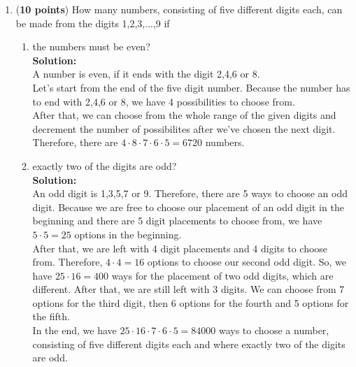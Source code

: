 \documentclass[a4paper]{article}
\begin{document}
\begin{enumerate}
\begin{enumerate}
	
\end{enumerate}




\item (\textbf{10 points}) How many numbers, consisting of five different digits each, can be made from the digits 1,2,3,...,9 if


\begin{enumerate}
	\item the numbers must be even?\\
	\textbf{Solution:}\\




A number is even, if it ends with the digit 2,4,6 or 8.\\
Let's start from the end of the five digit number. Because the number has to end with 2,4,6 or 8, we have 4 possibilities to choose from.\\

After that, we can choose from the whole range of the given digits and decrement the number of possibilites after we've chosen the next digit.\\

Therefore, there are $4 \cdot 8 \cdot 7 \cdot 6 \cdot 5 = 6720$ numbers.\\

	
	\item exactly two of the digits are odd?\\
	\textbf{Solution:}\\
	
An odd digit is 1,3,5,7 or 9. Therefore, there are 5 ways to choose an odd digit. Because we are free to choose our placement of an odd digit in the beginning and there are 5 digit placements to choose from, we have $5 \cdot 5 = 25$ options in the beginning.\\

After that, we are left with 4 digit placements and 4 digits to choose from. Therefore, $4 \cdot 4 = 16$ options to choose our second odd digit. So, we have $25 \cdot 16 = 400$ ways for the placement of two odd digits, which are different. After that, we are still left with 3 digits. We can choose from 7 options for the third digit, then 6 options for the fourth and 5 options for the fifth.\\

In the end, we have $25 \cdot 16 \cdot 7 \cdot 6 \cdot 5 = 84000$ ways to choose a number, consisting of five different digits each and where exactly two of the digits are odd.\\



\end{enumerate}
\end{enumerate}
\end{document}
